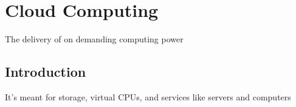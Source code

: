 \documentclass[a4paper,12pt]{book}
\begin{document}



\chapter{Cloud Computing}

The delivery of on demanding computing power
\clearpage

\section{Introduction}
It's meant for storage, virtual CPUs, and services like servers and computers
\end{document}
